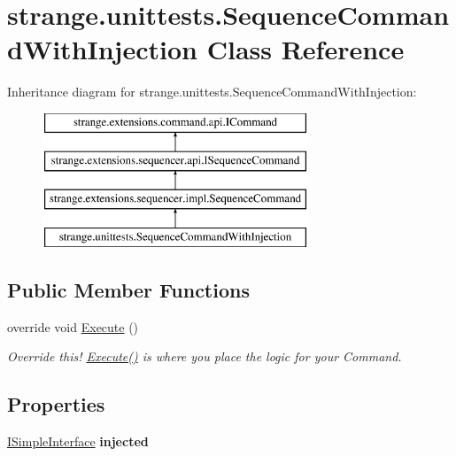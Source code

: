 \hypertarget{classstrange_1_1unittests_1_1_sequence_command_with_injection}{\section{strange.\-unittests.\-Sequence\-Command\-With\-Injection Class Reference}
\label{classstrange_1_1unittests_1_1_sequence_command_with_injection}
}
Inheritance diagram for strange.\-unittests.\-Sequence\-Command\-With\-Injection\-:\begin{figure}[H]
\begin{center}
\leavevmode
\includegraphics[height=4.000000cm]{classstrange_1_1unittests_1_1_sequence_command_with_injection}
\end{center}
\end{figure}
\subsection*{Public Member Functions}
\begin{DoxyCompactItemize}
\item 
\hypertarget{classstrange_1_1unittests_1_1_sequence_command_with_injection_a3646790a5d87795e6af1f0b5e7842d9f}{override void \hyperlink{classstrange_1_1unittests_1_1_sequence_command_with_injection_a3646790a5d87795e6af1f0b5e7842d9f}{Execute} ()}\label{classstrange_1_1unittests_1_1_sequence_command_with_injection_a3646790a5d87795e6af1f0b5e7842d9f}

\begin{DoxyCompactList}\small\item\em Override this! {\ttfamily \hyperlink{classstrange_1_1unittests_1_1_sequence_command_with_injection_a3646790a5d87795e6af1f0b5e7842d9f}{Execute()}} is where you place the logic for your Command. \end{DoxyCompactList}\end{DoxyCompactItemize}
\subsection*{Properties}
\begin{DoxyCompactItemize}
\item 
\hypertarget{classstrange_1_1unittests_1_1_sequence_command_with_injection_aa5696f81c606b8e5aa74b5e1fb164de4}{\hyperlink{interfacestrange_1_1unittests_1_1_i_simple_interface}{I\-Simple\-Interface} {\bfseries injected}}\label{classstrange_1_1unittests_1_1_sequence_command_with_injection_aa5696f81c606b8e5aa74b5e1fb164de4}

\end{DoxyCompactItemize}


